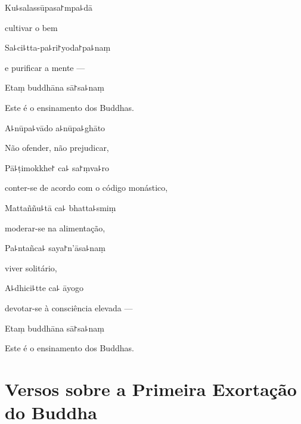 Ku꜕salassūpasa꜓mpa꜕dā

\begin{english}
  cultivar o bem
\end{english}

Sa꜕ci꜕tta-pa꜕ri꜓yoda꜓pa꜕naṃ

\begin{english}
  e purificar a mente ---
\end{english}

Etaṃ buddhāna sā꜓sa꜕naṃ

\begin{english}
  Este é o ensinamento dos Buddhas.
\end{english}

A꜕nūpa꜕vādo a꜕nūpa꜕ghāto

\begin{english}
  Não ofender, não prejudicar,
\end{english}

Pā꜕ṭimokkhe꜓ ca꜕ sa꜓ṃva꜕ro

\begin{english}
  conter-se de acordo com o código monástico,
\end{english}

Mattaññu꜕tā ca꜕ bhatta꜕smiṃ

\begin{english}
  moderar-se na alimentação,
\end{english}

Pa꜕ntañca꜕ saya꜓n'āsa꜕naṃ

\begin{english}
  viver solitário,
\end{english}

A꜕dhici꜕tte ca꜕ āyogo

\begin{english}
  devotar-se à consciência elevada ---
\end{english}

Etaṃ buddhāna sā꜓sa꜕naṃ

\begin{english}
  Este é o ensinamento dos Buddhas.
\end{english}

\chapter[A Primeira Exortação]{Versos sobre a Primeira Exortação do Buddha}


\begin{leader}
\end{leader}

